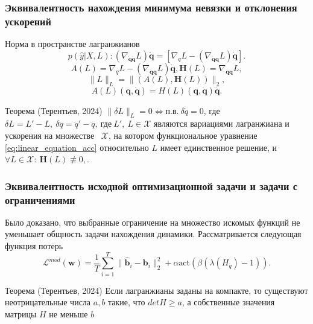 \documentclass{beamer}
\begin{document}
\begin{frame}
\frametitle{Эквивалентность нахождения минимума невязки и отклонения ускорений}
\begin{block} {Норма в пространстве лагранжианов}
\[
p(\hat{y}| X, L): \left(\nabla_{\dot{\mathbf{q}} \dot{\mathbf{q}}} L\right)\ddot{\mathbf{q}} = \left[\nabla_{q} L-\left(\nabla_{\dot{\mathbf{q}}\mathbf{q}} L\right) \dot{\mathbf{q}}\right].
\]
$$A(L) = \nabla_{q} L-\left(\nabla_{\dot{\mathbf{q}}\mathbf{q}} L\right) \dot{\mathbf{q}}, \mathbf{H}(L) = \nabla_{\dot{\mathbf{q}} \dot{\mathbf{q}}} L,$$
$$\|L\|_L = \|(A(L), \mathbf{H}(L))\|_2,$$
\begin{equation}\label{eq:linear_equation_acc}
A(L)(\mathbf{q}, \dot{\mathbf{q}}) = H(L)(\mathbf{q}, \dot{\mathbf{q}})\ddot{\mathbf{q}}.
\end{equation}
\end{block}

\begin{block} {Теорема (Терентьев, 2024)}
$\|\delta L\|_L = 0 \Leftrightarrow \text{п.в.}~\delta \ddot{q} = 0$, где $\delta L = L' - L, ~\delta \ddot{q} = \ddot{q}' - \ddot{q}, ~\text{где} \ L',\ L \in \mathcal {X}$ являются вариациями лагранжиана и ускорения на множестве ~$\mathcal {X}$, на котором функциональное уравнение \ref{eq:linear_equation_acc} относительно $L$ имеет единственное решение, и $\forall L\in \mathcal{X}:~\mathbf{H}(L) \not\equiv 0, $.
\end{block}

\end{frame}



\begin{frame}
\frametitle{Эквивалентность исходной оптимизационной задачи и задачи с ограничениями}

Было доказано, что выбранные ограничение на множество искомых функций не уменьшает общность задачи нахождения динамики. Рассматривается следующая функция потерь
$$
 \mathcal{L}^{mod}(\textbf{w}) = \frac{1}{T}\sum_{i=1}^{T} \| \mathbf{\hat{b}}_i - \mathbf{b}_i \|_2^2  + \alpha \text{act}(\beta (\lambda(H_{\ddot{q}}) - 1)).
$$

\begin{block} {Теорема (Терентьев, 2024)}
Если лагранжианы заданы на компакте, то существуют неотрицательные числа $a, b$ такие, что $det H \ge a$, а собственные значения матрицы $H$ не меньше $b$
\end{block} 
\end{frame}
\end{document}

